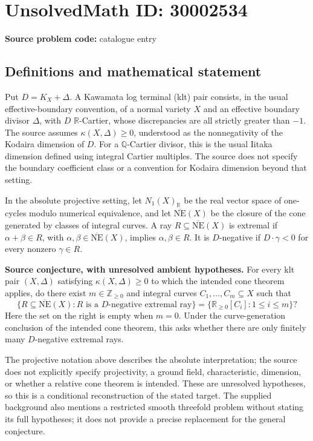 \documentclass[11pt]{article}
\newcommand{\Z}{\mathbb{Z}}
\newcommand{\Q}{\mathbb{Q}}
\newcommand{\R}{\mathbb{R}}
\begin{document}
\section*{UnsolvedMath ID: 30002534}
\textbf{Source problem code:} catalogue entry
\subsection{Definitions and mathematical statement}
Put \(D=K_X+\Delta\). A Kawamata log terminal (klt) pair consists, in the usual effective-boundary convention, of a normal variety \(X\) and an effective boundary divisor \(\Delta\), with \(D\) \(\R\)-Cartier, whose discrepancies are all strictly greater than \(-1\). The source assumes \(\kappa(X,\Delta)\geq 0\), understood as the nonnegativity of the Kodaira dimension of \(D\). For a \(\Q\)-Cartier divisor, this is the usual Iitaka dimension defined using integral Cartier multiples. The source does not specify the boundary coefficient class or a convention for Kodaira dimension beyond that setting.

In the absolute projective setting, let \(N_1(X)_{\R}\) be the real vector space of one-cycles modulo numerical equivalence, and let \(\overline{\mathrm{NE}}(X)\) be the closure of the cone generated by classes of integral curves. A ray \(R\subseteq\overline{\mathrm{NE}}(X)\) is extremal if \(\alpha+\beta\in R\), with \(\alpha,\beta\in\overline{\mathrm{NE}}(X)\), implies \(\alpha,\beta\in R\). It is \(D\)-negative if \(D\cdot\gamma<0\) for every nonzero \(\gamma\in R\).

\textbf{Source conjecture, with unresolved ambient hypotheses.} For every klt pair \((X,\Delta)\) satisfying \(\kappa(X,\Delta)\geq0\) to which the intended cone theorem applies, do there exist \(m\in\Z_{\geq0}\) and integral curves \(C_1,\ldots,C_m\subseteq X\) such that
\[
\bigl\{R\subseteq\overline{\mathrm{NE}}(X):R\text{ is a }D\text{-negative extremal ray}\bigr\}
=\bigl\{\R_{\geq0}[C_i]:1\leq i\leq m\bigr\}?
\]
Here the set on the right is empty when \(m=0\). Under the curve-generation conclusion of the intended cone theorem, this asks whether there are only finitely many \(D\)-negative extremal rays.

The projective notation above describes the absolute interpretation; the source does not explicitly specify projectivity, a ground field, characteristic, dimension, or whether a relative cone theorem is intended. These are unresolved hypotheses, so this is a conditional reconstruction of the stated target. The supplied background also mentions a restricted smooth threefold problem without stating its full hypotheses; it does not provide a precise replacement for the general conjecture.
\end{document}
